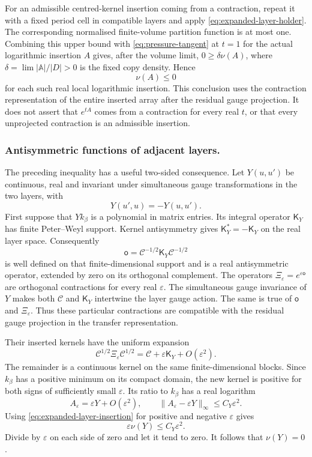 \documentclass[11pt,letterpaper,reqno]{amsart}
\theoremstyle{definition}
\theoremstyle{remark}
\begin{document}
For an admissible centred-kernel insertion coming from a contraction,
repeat it with a fixed period cell in compatible layers and apply \eqref{eq:expanded-layer-holder}. The corresponding
normalised finite-volume partition function is at most one. Combining
this upper bound with \eqref{eq:pressure-tangent} at $t=1$ for the
actual logarithmic insertion $A$ gives, after the volume limit,
$0\ge\delta\nu(A)$, where
$\delta=\lim|\mathbb A|/|D|>0$ is the fixed copy density. Hence
\begin{equation}\label{eq:expanded-layer-insertion}
 \nu(A)\le0
\end{equation}
for each such real local logarithmic insertion. This conclusion uses
the contraction representation of the entire inserted array after
the residual gauge projection. It does not assert that
$e^{tA}$ comes from a contraction for every real $t$, or that every
unprojected contraction is an admissible insertion.

\subsubsection*{Antisymmetric functions of adjacent layers.}
The preceding inequality has a useful two-sided consequence. Let
$Y(u,u')$ be continuous, real and invariant under simultaneous gauge
transformations in the two layers, with
\[
 Y(u',u)=-Y(u,u').
\]
First suppose that $Yk_\beta$ is a polynomial in matrix entries. Its
integral operator $\mathsf K_Y$ has finite Peter--Weyl support. Kernel
antisymmetry gives $\mathsf K_Y^*=-\mathsf K_Y$ on the real layer
space. Consequently
\[
 \mathsf o=\mathcal C^{-1/2}\mathsf K_Y\mathcal C^{-1/2}
\]
is well defined on that finite-dimensional support and is a real
antisymmetric operator, extended by zero on its orthogonal
complement. The operators $\Xi_\varepsilon=e^{\varepsilon\mathsf o}$
are orthogonal contractions for every real $\varepsilon$. The
simultaneous gauge invariance of $Y$ makes both $\mathcal C$ and
$\mathsf K_Y$ intertwine the layer gauge action. The same is true
of $\mathsf o$ and $\Xi_\varepsilon$. Thus these particular
contractions are compatible with the residual gauge projection in
the transfer representation.

Their inserted kernels have the uniform expansion
\[
 \mathcal C^{1/2}\Xi_\varepsilon\mathcal C^{1/2}
 =\mathcal C+\varepsilon\mathsf K_Y+O(\varepsilon^2).
\]
The remainder is a continuous kernel on the same finite-dimensional
blocks. Since $k_\beta$ has a positive minimum on its compact domain,
the new kernel is positive for both signs of sufficiently small
$\varepsilon$. Its ratio to $k_\beta$ has a real logarithm
\[
 A_\varepsilon=\varepsilon Y+O(\varepsilon^2),
 \qquad
 \|A_\varepsilon-\varepsilon Y\|_\infty
                                      \le C_Y\varepsilon^2.
\]
Using \eqref{eq:expanded-layer-insertion} for positive and negative
$\varepsilon$ gives
\[
 \varepsilon\nu(Y)\le C_Y\varepsilon^2.
\]
Divide by $\varepsilon$ on each side of zero and let it tend to zero.
It follows that $\nu(Y)=0$.
\end{document}
